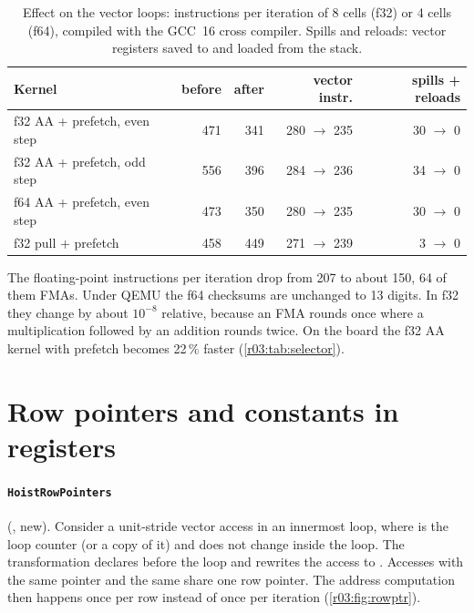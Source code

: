 \begin{table}[htbp]
  \centering\small
  \caption{Effect on the vector loops: instructions per iteration of 8 cells (f32) or 4 cells
    (f64), compiled with the GCC~16 cross compiler. Spills and reloads: vector registers saved to
    and loaded from the stack.}\label{r03:tab:selector-insns}
  \begin{tabular}{@{}lrrrr@{}}
    \toprule
    \textbf{Kernel} & \textbf{before} & \textbf{after} & \textbf{vector instr.} & \textbf{spills + reloads}\\
    \midrule
    f32 AA + prefetch, even step & 471 & 341 & 280 $\rightarrow$ 235 & 30 $\rightarrow$ 0\\
    f32 AA + prefetch, odd step & 556 & 396 & 284 $\rightarrow$ 236 & 34 $\rightarrow$ 0\\
    f64 AA + prefetch, even step & 473 & 350 & 280 $\rightarrow$ 235 & 30 $\rightarrow$ 0\\
    f32 pull + prefetch & 458 & 449 & 271 $\rightarrow$ 239 & 3 $\rightarrow$ 0\\
    \bottomrule
  \end{tabular}
\end{table}

The floating-point instructions per iteration drop from 207 to about 150, 64 of them FMAs.
Under QEMU the f64 checksums are unchanged to 13 digits. In f32 they change by about
$10^{-8}$ relative, because an FMA rounds once where a multiplication followed by an addition
rounds twice. On the board the f32 AA kernel with prefetch becomes 22\,\% faster
(\cref{r03:tab:selector}).

\section{Row pointers and constants in registers}\label{r03:sec:ps-rowptr}

\paragraph{\texttt{HoistRowPointers}}
(, new). Consider a
unit-stride vector access  in an innermost loop, where  is the
loop counter (or a copy of it) and  does not change inside the loop. The
transformation declares  before the loop and rewrites the access to
. Accesses with the same pointer and the same  share one row pointer.
The address computation then happens once per row instead of once per iteration
(\cref{r03:fig:rowptr}).

